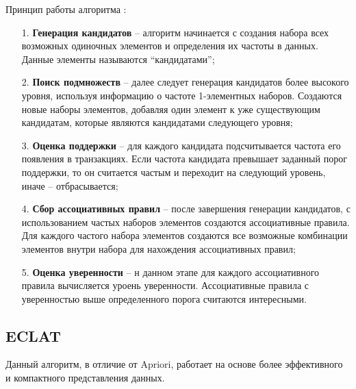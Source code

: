 Принцип работы алгоритма \cite{sr1}:
\begin{enumerate}
	\item[1.] \textbf{Генерация кандидатов} -- алгоритм начинается с создания набора всех возможных одиночных элементов и определения их частоты в данных. Данные элементы называются ``кандидатами'';
	\item[2.] \textbf{Поиск подмножеств} -- далее следует генерация кандидатов более высокого уровня, используя информацию о частоте 1-элементных наборов. Создаются новые наборы элементов, добавляя один элемент к уже существующим кандидатам, которые являются кандидатами следующего уровня;
	\item[3.] \textbf{Оценка поддержки} -- для каждого кандидата подсчитывается частота его появления в транзакциях. Если частота кандидата превышает заданный порог поддержки, то он считается частым и переходит на следующий уровень, иначе -- отбрасывается;
	\item[4.] \textbf{Сбор ассоциативных правил} -- после завершения генерации кандидатов, с использованием частых наборов элементов создаются ассоциативные правила. Для каждого частого набора элементов создаются все возможные комбинации элементов внутри набора для нахождения ассоциативных правил;
	\item[5.] \textbf{Оценка уверенности} -- н данном этапе для каждого ассоциативного правила вычисляется уроень уверенности. Ассоциативные правила с уверенностью выше определенного порога считаются интересными.
\end{enumerate}

\subsection{ECLAT}

Данный алгоритм, в отличие от Apriori, работает на основе более эффективного и компактного представления данных.

